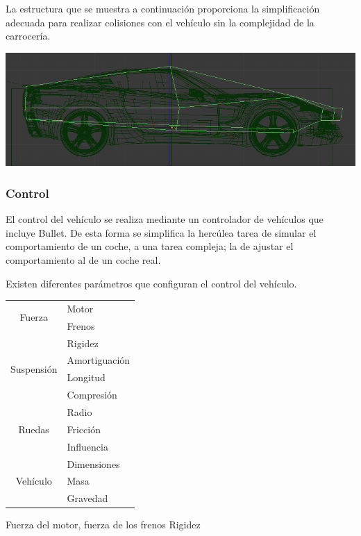 \documentclass[10pt,a4paper,hidelinks]{article}
\begin{document}
La estructura que se muestra a continuación proporciona la simplificación 
adecuada para realizar colisiones con el vehículo sin la complejidad de la 
carrocería.

\includegraphics[width=\textwidth]{vehiculo-colision}

\subsubsection{Control}
El control del vehículo se realiza mediante un controlador de vehículos que 
incluye Bullet. De esta forma se simplifica la hercúlea tarea de simular el 
comportamiento de un coche, a una tarea compleja; la de ajustar el 
comportamiento al de un coche real.

Existen diferentes parámetros que configuran el control del vehículo.

\begin{table}
\begin{tabular}{ | c | l | }
	\hline
	\multirow{2}{*}{Fuerza}
	& Motor \\
	& Frenos \\
	\hline
	\multirow{4}{*}{Suspensión}
	& Rigidez \\
	& Amortiguación \\
	& Longitud \\
	& Compresión \\
	\hline
	\multirow{3}{*}{Ruedas}
	& Radio \\
	& Fricción \\
	& Influencia \\
	\hline
	\multirow{3}{*}{Vehículo}
	& Dimensiones \\
	& Masa \\
	& Gravedad \\
	\hline
\end{tabular}
\end{table}

Fuerza del motor, fuerza de los frenos
Rigidez
\end{document}
